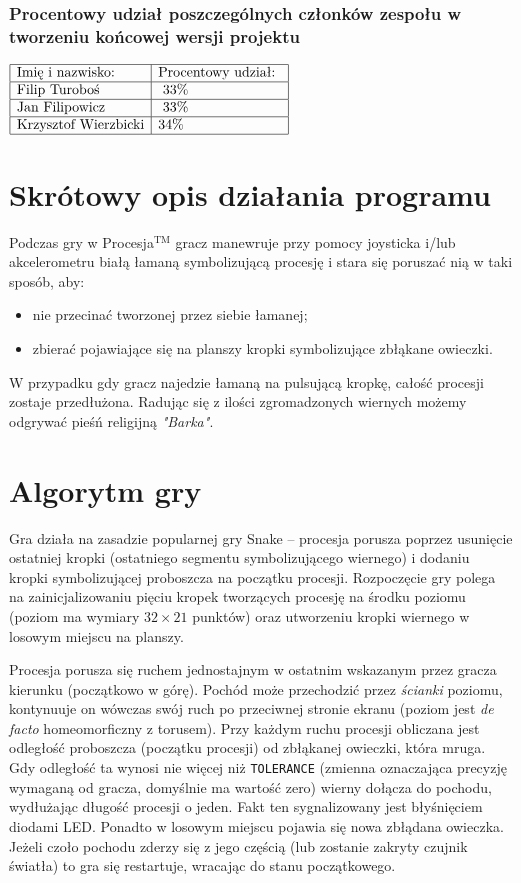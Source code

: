 \documentclass[a4paper,12pt,twoside]{article}
\theoremstyle{plain}
\theoremstyle{definition}
\theoremstyle{remark}
\begin{document}
\subsubsection{Procentowy udział poszczególnych członków zespołu w tworzeniu końcowej wersji projektu}
$\begin{array}{|l|l|l|}
\hline
\textrm{Imię i nazwisko: }& \textrm{Procentowy udział: }\\
\hline
 \textrm{Filip Turoboś}&\textrm{ 33\%}\\
\hline
\textrm{Jan Filipowicz}&\textrm{	33\% 	}\\
\hline
\textrm{Krzysztof Wierzbicki}& \textrm{34\%}\\
\hline
\end{array}$
\newpage
\section{Skrótowy opis działania programu}
Podczas gry w Procesja$^{\textrm{TM}}$ gracz manewruje przy pomocy joysticka i/lub akcelerometru białą łamaną symbolizującą procesję i stara się poruszać nią w taki sposób, aby:
\begin{itemize}
	\item nie przecinać tworzonej przez siebie łamanej; 
	\item zbierać pojawiające się na planszy kropki symbolizujące zbłąkane owieczki.
\end{itemize}

W przypadku gdy gracz najedzie łamaną na pulsującą kropkę, całość procesji zostaje przedłużona. Radując się z ilości zgromadzonych wiernych możemy odgrywać pieśń religijną \textit{"Barka"}.

\section{Algorytm gry}
Gra działa na zasadzie popularnej gry Snake -- procesja porusza poprzez usunięcie ostatniej kropki (ostatniego segmentu symbolizującego wiernego) i dodaniu kropki symbolizującej proboszcza na początku procesji. Rozpoczęcie gry polega na zainicjalizowaniu pięciu kropek tworzących procesję na środku poziomu (poziom ma wymiary $32 \times 21$ punktów) oraz utworzeniu kropki wiernego w losowym miejscu na planszy.

Procesja porusza się ruchem jednostajnym w ostatnim wskazanym przez gracza kierunku (początkowo w górę). Pochód może przechodzić przez \textit{ścianki} poziomu, kontynuuje on wówczas swój ruch po przeciwnej stronie ekranu (poziom jest \textit{de facto} homeomorficzny z torusem). Przy każdym ruchu procesji obliczana jest odległość proboszcza (początku procesji) od zbłąkanej owieczki, która mruga. Gdy odległość ta wynosi nie więcej niż \verb|TOLERANCE| (zmienna oznaczająca precyzję wymaganą od gracza, domyślnie ma wartość zero) wierny dołącza do pochodu, wydłużając długość procesji o jeden. Fakt ten sygnalizowany jest błyśnięciem diodami LED. Ponadto w losowym miejscu pojawia się nowa zbłądana owieczka. Jeżeli czoło pochodu zderzy się z jego częścią (lub zostanie zakryty czujnik światła) to gra się restartuje, wracając do stanu początkowego. 
\end{document}
